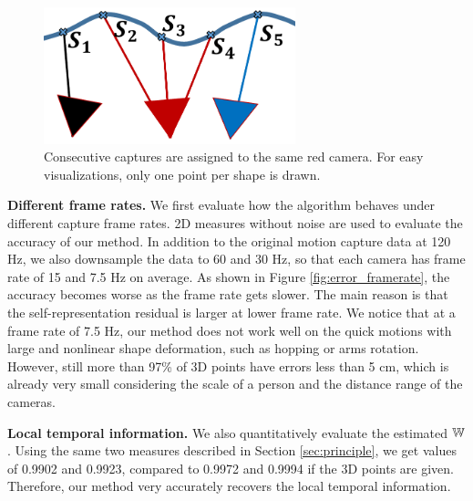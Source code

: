\begin{figure}
\centering
\includegraphics[width=0.65\textwidth]{chapter5/resource/unconstrained_assignment_cropped.pdf}
\caption[Illustration of consecutive captures assigned to the same camera.]{Consecutive captures are assigned to the same red camera. For easy visualizations, only one point per shape is drawn.}
\label{fig:unconstrained_assign}
\end{figure}

\textbf{Different frame rates.}
We first evaluate how the algorithm behaves under different capture frame rates.
2D measures without noise are used to evaluate the accuracy of our method. In addition to the original motion capture data at 120 Hz, we also downsample the data to 60 and 30 Hz, so that each camera has frame rate of 15 and 7.5 Hz on average. As shown in Figure \ref{fig:error_framerate}, the accuracy becomes worse as the frame rate gets slower. 
The main reason is that the self-representation residual is larger at lower frame rate. We notice that at a frame rate of 7.5 Hz, our method does not work well on the quick motions with large and nonlinear shape deformation, such as hopping or arms rotation. However, still  more than 97\% of 3D points have errors less than 5 cm, which is already very small considering the scale of a person and the distance range of the cameras.

\textbf{Local temporal information.}
We also quantitatively evaluate the estimated $\mathbb W$. Using the same two measures described in Section \ref{sec:principle}, 
we get values of 0.9902 and 0.9923, compared to 0.9972 and 0.9994 if the 3D points are given. Therefore, our method very accurately recovers the local temporal information.

